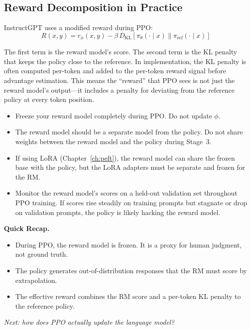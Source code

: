 \subsection{Reward Decomposition in Practice}

InstructGPT uses a modified reward during PPO:
\begin{equation}
\label{eq:rlhf-reward}
R(x, y) = r_\phi(x, y) - \beta \, D_{\text{KL}}\!\left[\pi_\theta({\cdot} \mid x) \| \pi_{\text{ref}}({\cdot} \mid x)\right]
\end{equation}

The first term is the reward model's score. The second term is the KL penalty that keeps the policy close to the reference. In implementation, the KL penalty is often computed per-token and added to the per-token reward signal before advantage estimation. This means the ``reward'' that PPO sees is not just the reward model's output---it includes a penalty for deviating from the reference policy at every token position.

\begin{tcolorbox}[colback=orange!5, colframe=orange!60, title=\textbf{For Project~3: Reward Model During PPO}]
\begin{itemize}[nosep]
  \item Freeze your reward model completely during PPO. Do not update $\phi$.
  \item The reward model should be a separate model from the policy. Do not share weights between the reward model and the policy during Stage~3.
  \item If using LoRA (Chapter~\ref{ch:peft}), the reward model can share the frozen base with the policy, but the LoRA adapters must be separate and frozen for the RM.
  \item Monitor the reward model's scores on a held-out validation set throughout PPO training. If scores rise steadily on training prompts but stagnate or drop on validation prompts, the policy is likely hacking the reward model.
\end{itemize}
\end{tcolorbox}

\begin{quickrecap}
\textbf{Quick Recap.}
\begin{itemize}[nosep,leftmargin=1.5em]
  \item During PPO, the reward model is frozen. It is a proxy for human judgment, not ground truth.
  \item The policy generates out-of-distribution responses that the RM must score by extrapolation.
  \item The effective reward combines the RM score and a per-token KL penalty to the reference policy.
\end{itemize}
\textit{Next: how does PPO actually update the language model?}
\end{quickrecap}


